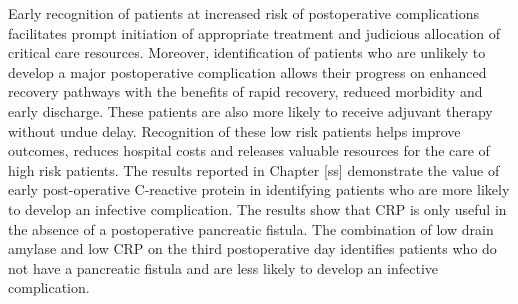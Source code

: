 Early recognition of patients at increased risk of postoperative complications facilitates prompt initiation of appropriate treatment and judicious allocation of critical care resources. Moreover, identification of patients who are unlikely to develop a major postoperative complication allows their progress on enhanced recovery pathways with the benefits of rapid recovery, reduced morbidity and early discharge. These patients are also more likely to receive adjuvant therapy without undue delay. Recognition of these low risk patients helps improve outcomes, reduces hospital costs and releases valuable resources for the care of high risk patients. The results reported in Chapter [ss] demonstrate the value of early post-operative C-reactive protein in identifying patients who are more likely to develop an infective complication. The results show that CRP is only useful in the absence of a postoperative pancreatic fistula. The combination of low drain amylase and low CRP on the third postoperative day identifies patients who do not have a pancreatic fistula and are less likely to develop an infective complication. 